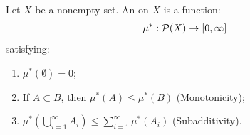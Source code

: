     \begin{definition}
        Let $X$ be a nonempty set. An  on $X$ is a function:
            \begin{equation*}
            \begin{split}
                \mu^\ast :\mathcal{P}(X) \rightarrow [0,\infty]
            \end{split}
            \end{equation*}
        satisfying:
            \begin{enumerate}[label = (\arabic*),itemsep=1pt,topsep=3pt]
                \item $\mu^\ast (\emptyset)= 0$;
                \item If $A \subset B$, then $\mu^\ast(A) \leq \mu^\ast (B)$ (Monotonicity);
                \item $\mu^\ast \left( \bigcup_{i = 1}^\infty A_i \right) \leq \sum_{i = 1}^\infty \mu^\ast(A_i)$ (Subadditivity).
            \end{enumerate}
    \end{definition}

